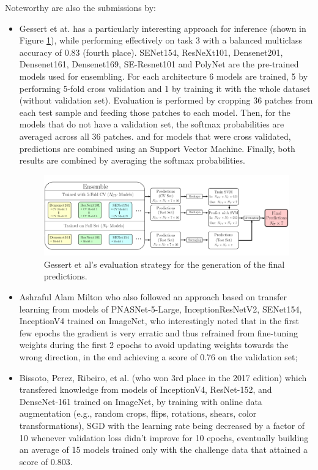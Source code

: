 Noteworthy are also the submissions by: 
\begin{itemize}
    \item Gessert et at. \cite{gessert2018} has a particularly interesting approach for inference (shown in Figure \ref{fig:gessert2018}), while performing effectively on task 3 with a balanced multiclass accuracy of 0.83 (fourth place). SENet154, ResNeXt101, Densenet201, Densenet161, Densenet169, SE-Resnet101 and PolyNet are the pre-trained models used for ensembling. For each architecture 6 models are trained, 5 by performing 5-fold cross validation and 1 by training it with the whole dataset (without validation set). Evaluation is performed by cropping 36 patches from each test sample and feeding those patches to each model. Then, for the models that do not have a validation set, the softmax probabilities are averaged across all 36 patches. and for models that were cross validated, predictions are combined using an Support Vector Machine. Finally, both results are combined by averaging the softmax probabilities.
    \begin{figure}[ht]
        \centering
        \includegraphics[width=\linewidth]{figs/gessert2018.png}
        \caption{Gessert et al's evaluation strategy for the generation of the final predictions. \cite{gessert2018}}
        \label{fig:gessert2018}
    \end{figure}
    \item Ashraful Alam Milton \cite{Milton2018} who also followed an approach based on transfer learning from models of PNASNet-5-Large, InceptionResNetV2, SENet154, InceptionV4 trained on ImageNet, who interestingly noted that in the first few epochs the gradient is very erratic and thus refrained from fine-tuning weights during the first 2 epochs to avoid updating weights towards the wrong direction, in the end achieving a score of 0.76 on the validation set;
    \item Bissoto, Perez, Ribeiro, et al. \cite{Bissoto2018} (who won 3rd place in the 2017 edition) which transfered knowledge from models of InceptionV4, ResNet-152, and DenseNet-161 trained on ImageNet, by training with online data augmentation (e.g., random crops, flips, rotations, shears, color transformations), SGD with the learning rate being decreased by a factor of 10 whenever validation loss didn’t improve for 10 epochs, eventually building an average of 15 models trained only with the challenge data that attained a score of 0.803.
\end{itemize}

